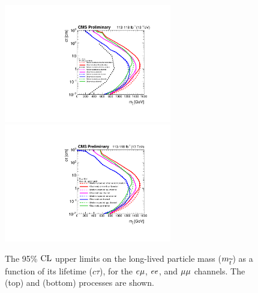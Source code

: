 \begin{figure}
\centering
\includegraphics[width=0.65\textwidth]{figures/results/2DlimitsStopToLB.pdf}
\includegraphics[width=0.65\textwidth]{figures/results/2DlimitsStopToLD.pdf}
\caption{The 95\% $\text{CL}$ upper limits on the long-lived particle mass ($m_{\widetilde{t}}$) as a function of its lifetime ($c\tau$), for the $e{\mu}$, $ee$, and ${\mu}{\mu}$ channels. The \stoptolb (top) and \stoptold (bottom) processes are shown.} 
\label{limits_individual}
\end{figure}

